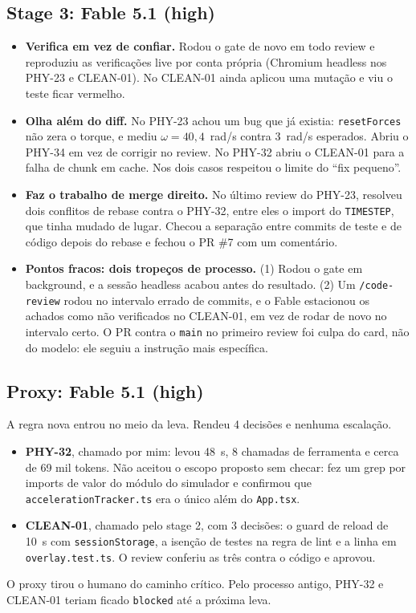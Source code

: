 \documentclass[11pt,a4paper]{article}
\newcommand{\tk}[1]{\texttt{#1}}
\begin{document}
\subsection*{Stage 3: Fable 5.1 (high)}
\begin{itemize}
  \item \textbf{Verifica em vez de confiar.} Rodou o gate de novo em todo review e reproduziu as verificações live por conta própria (Chromium headless nos PHY-23 e CLEAN-01). No CLEAN-01 ainda aplicou uma mutação e viu o teste ficar vermelho.
  \item \textbf{Olha além do diff.} No PHY-23 achou um bug que já existia: \tk{resetForces} não zera o torque, e mediu $\omega = 40{,}4$~rad/s contra 3~rad/s esperados. Abriu o PHY-34 em vez de corrigir no review. No PHY-32 abriu o CLEAN-01 para a falha de chunk em cache. Nos dois casos respeitou o limite do ``fix pequeno''.
  \item \textbf{Faz o trabalho de merge direito.} No último review do PHY-23, resolveu dois conflitos de rebase contra o PHY-32, entre eles o import do \tk{TIMESTEP}, que tinha mudado de lugar. Checou a separação entre commits de teste e de código depois do rebase e fechou o PR \#7 com um comentário.
  \item \textbf{Pontos fracos: dois tropeços de processo.} (1) Rodou o gate em background, e a sessão headless acabou antes do resultado. (2) Um \tk{/code-review} rodou no intervalo errado de commits, e o Fable estacionou os achados como não verificados no CLEAN-01, em vez de rodar de novo no intervalo certo. O PR contra o \tk{main} no primeiro review foi culpa do card, não do modelo: ele seguiu a instrução mais específica.
\end{itemize}

\subsection*{Proxy: Fable 5.1 (high)}
A regra nova entrou no meio da leva.
Rendeu 4 decisões e nenhuma escalação.
\begin{itemize}
  \item \textbf{PHY-32}, chamado por mim: levou 48~s, 8 chamadas de ferramenta e cerca de 69 mil tokens. Não aceitou o escopo proposto sem checar: fez um grep por imports de valor do módulo do simulador e confirmou que \tk{accelerationTracker.ts} era o único além do \tk{App.tsx}.
  \item \textbf{CLEAN-01}, chamado pelo stage 2, com 3 decisões: o guard de reload de 10~s com \tk{sessionStorage}, a isenção de testes na regra de lint e a linha em \tk{overlay.test.ts}. O review conferiu as três contra o código e aprovou.
\end{itemize}
O proxy tirou o humano do caminho crítico.
Pelo processo antigo, PHY-32 e CLEAN-01 teriam ficado \tk{blocked} até a próxima leva.
\end{document}
